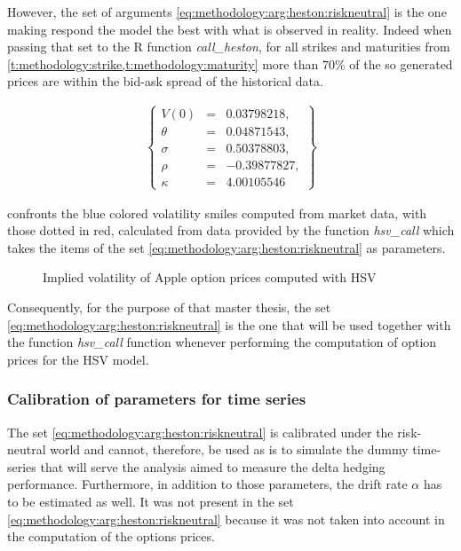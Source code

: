 \documentclass[12pt]{report}
\begin{document}
However, the set of arguments \ref{eq:methodology:arg:heston:riskneutral} is the one making respond the model the best with what is observed in reality.
Indeed when passing that set to the R function \textit{call\_heston}, for all strikes and maturities from \cref{t:methodology:strike,t:methodology:maturity}  more than $70\%$ of the so generated prices are within the bid-ask spread of the historical data.

\begin{align}
  \left \{
  \begin{array}{lcl}
    V(0) &= &0.03798218, \\
    \theta &= &0.04871543, \\
    \sigma &= &0.50378803, \\
    \rho &= &-0.39877827, \\
    \kappa &= &4.00105546 
  \end{array}
  \right \}  
  \label{eq:methodology:arg:heston:riskneutral}
\end{align}

 confronts the blue colored volatility smiles computed from market data, with those dotted in red, calculated from data provided by the function \textit{hsv\_call} which takes the items of the set \ref{eq:methodology:arg:heston:riskneutral} as parameters.

\begin{figure}[ht]
  \centering
  
  \caption{Implied volatility of Apple option prices computed with HSV}
  \label{p:methodology:impliedvol:aapl:heston}
\end{figure}


Consequently, for the purpose of that master thesis, the set \ref{eq:methodology:arg:heston:riskneutral} is the one that will be used together with the function \textit{hsv\_call} function whenever performing the computation of option prices for the HSV model.

\subsubsection*{Calibration of parameters for time series}

The set \ref{eq:methodology:arg:heston:riskneutral} is calibrated under the risk-neutral world and cannot, therefore, be used as is to simulate the dummy time-series that will serve the analysis aimed to measure the delta hedging performance.
Furthermore, in addition to those parameters, the drift rate $\alpha$ has to be estimated as well. It was not present in the set  \ref{eq:methodology:arg:heston:riskneutral} because it was not taken into account in the computation of the options prices.
\end{document}
